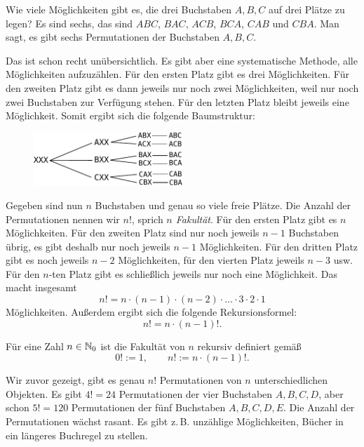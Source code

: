 Wie viele Möglichkeiten gibt es, die drei Buchstaben $A,B,C$ auf
drei Plätze zu legen? Es sind sechs, das sind
$ABC$, $BAC$, $ACB$, $BCA$, $CAB$ und $CBA$. Man sagt, es gibt
sechs Permutationen der Buchstaben $A,B,C$.

Das ist schon recht unübersichtlich. Es gibt aber eine systematische
Methode, alle Möglichkeiten aufzuzählen. Für den ersten Platz gibt
es drei Möglichkeiten. Für den zweiten Platz gibt es dann jeweils
nur noch zwei Möglichkeiten, weil nur noch zwei Buchstaben zur
Verfügung stehen. Für den letzten Platz bleibt jeweils eine
Möglichkeit. Somit ergibt sich die folgende Baumstruktur:

\begin{figure}[h]
\begin{center}
\includegraphics[width=0.5\textwidth]{img/Perm-ABC.pdf}
\end{center}
\end{figure}

\noindent
Gegeben sind nun $n$ Buchstaben und genau so viele freie Plätze.
Die Anzahl der Permutationen nennen wir $n!$, sprich \emph{$n$ Fakultät}.
Für den ersten Platz gibt es $n$ Möglichkeiten. Für den zweiten Platz
sind nur noch jeweils $n-1$ Buchstaben übrig, es gibt deshalb nur noch
jeweils $n-1$ Möglichkeiten. Für den dritten Platz gibt es noch jeweils
$n-2$ Möglichkeiten, für den vierten Platz jeweils $n-3$ usw. Für den
$n$-ten Platz gibt es schließlich jeweils nur noch eine Möglichkeit.
Das macht insgesamt
\[n! = n\cdot (n-1)\cdot (n-2)\cdot\ldots\cdot 3\cdot 2\cdot 1\]
Möglichkeiten. Außerdem ergibt sich die folgende Rekursionsformel:
\[n! = n\cdot (n-1)!.\]
\begin{Definition}[Fakultät]
Für eine Zahl $n\in\mathbb N_0$ ist die Fakultät von $n$ rekursiv
definiert gemäß
\[0! := 1,\qquad n! := n\cdot (n-1)!.\]
\end{Definition}
Wir zuvor gezeigt, gibt es genau $n!$ Permutationen von $n$
unterschiedlichen Objekten. Es gibt $4!=24$ Permutationen
der vier Buchstaben $A,B,C,D$, aber schon $5!=120$ Permutationen der
fünf Buchstaben $A,B,C,D,E$. Die Anzahl der Permutationen wächst
rasant. Es gibt z.\,B. unzählige Möglichkeiten, Bücher in ein
längeres Buchregel zu stellen.


